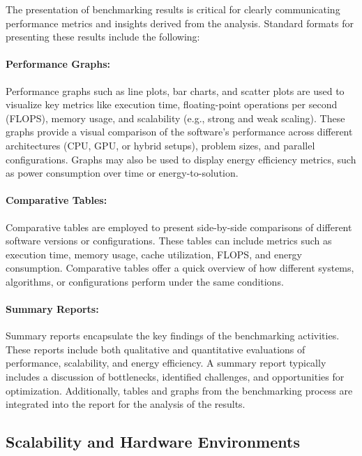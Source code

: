The presentation of benchmarking results is critical for clearly communicating performance metrics and insights derived from the analysis. Standard formats for presenting these results include the following:

\paragraph{Performance Graphs:} Performance graphs such as line plots, bar charts, and scatter plots are used to visualize key metrics like execution time, floating-point operations per second (FLOPS), memory usage, and scalability (e.g., strong and weak scaling). These graphs provide a visual comparison of the software's performance across different architectures (CPU, GPU, or hybrid setups), problem sizes, and parallel configurations. Graphs may also be used to display energy efficiency metrics, such as power consumption over time or energy-to-solution.

\paragraph{Comparative Tables:} Comparative tables are employed to present side-by-side comparisons of different software versions or configurations. These tables can include metrics such as execution time, memory usage, cache utilization, FLOPS, and energy consumption. Comparative tables offer a quick overview of how different systems, algorithms, or configurations perform under the same conditions.

\paragraph{Summary Reports:} Summary reports encapsulate the key findings of the benchmarking activities. These reports include both qualitative and quantitative evaluations of performance, scalability, and energy efficiency. A summary report typically includes a discussion of bottlenecks, identified challenges, and opportunities for optimization. Additionally, tables and graphs from the benchmarking process are integrated into the report for the analysis of the results.


\subsection{Scalability and Hardware Environments}
\label{sec:methodology-environments}

